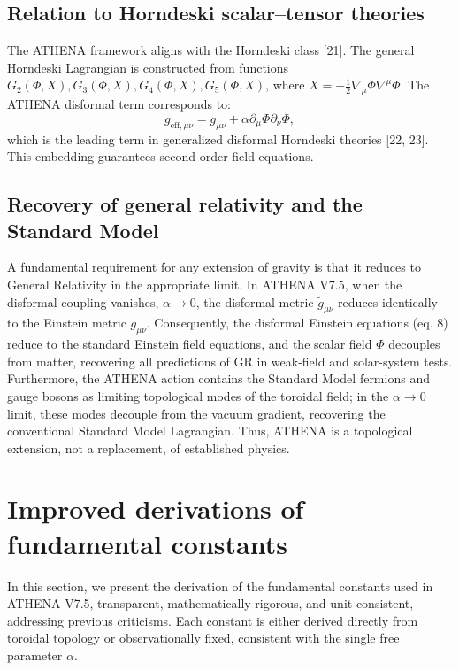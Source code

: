 \documentclass[11pt,a4paper]{article}
\begin{document}
\subsection{Relation to Horndeski scalar–tensor theories}
\label{subsec:horndeski}
The ATHENA framework aligns with the Horndeski class [21]. The general Horndeski Lagrangian is constructed from functions \(G_2(\Phi, X), G_3(\Phi, X), G_4(\Phi, X), G_5(\Phi, X)\), where \(X = -\frac{1}{2}\nabla_\mu \Phi \nabla^\mu \Phi\). The ATHENA disformal term corresponds to:
\[
g_{\mathrm{eff},\mu\nu} = g_{\mu\nu} + \alpha \partial_\mu \Phi \partial_\nu \Phi, \tag{9}
\]
which is the leading term in generalized disformal Horndeski theories [22, 23]. This embedding guarantees second-order field equations.

\subsection{Recovery of general relativity and the Standard Model}
\label{subsec:limiting}
A fundamental requirement for any extension of gravity is that it reduces to General Relativity in the appropriate limit. In ATHENA V7.5, when the disformal coupling vanishes, \(\alpha \to 0\), the disformal metric \(\tilde{g}_{\mu\nu}\) reduces identically to the Einstein metric \(g_{\mu\nu}\). Consequently, the disformal Einstein equations (eq. 8) reduce to the standard Einstein field equations, and the scalar field \(\Phi\) decouples from matter, recovering all predictions of GR in weak-field and solar-system tests. Furthermore, the ATHENA action contains the Standard Model fermions and gauge bosons as limiting topological modes of the toroidal field; in the \(\alpha \to 0\) limit, these modes decouple from the vacuum gradient, recovering the conventional Standard Model Lagrangian. Thus, ATHENA is a topological extension, not a replacement, of established physics.

\section{Improved derivations of fundamental constants}
\label{sec:constants}
In this section, we present the derivation of the fundamental constants used in ATHENA V7.5, transparent, mathematically rigorous, and unit-consistent, addressing previous criticisms. Each constant is either derived directly from toroidal topology or observationally fixed, consistent with the single free parameter \(\alpha\).
\end{document}
